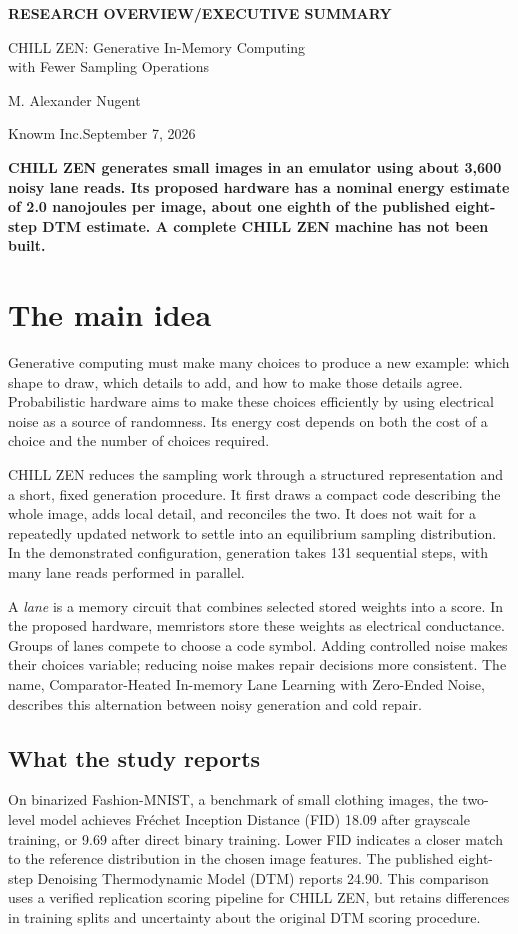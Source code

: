 \documentclass[11pt,letterpaper]{article}
\newcommand{\takeaway}[1]{\par\medskip\noindent\colorbox{pale}{\parbox{\dimexpr\linewidth-2\fboxsep\relax}{\vspace{5pt}\textbf{#1}\vspace{5pt}}}\par\medskip}
\begin{document}
\thispagestyle{plain}
{\small\bfseries\color{ink}RESEARCH OVERVIEW\enspace /\enspace EXECUTIVE SUMMARY\par}
\vspace{9pt}
{\LARGE\bfseries\color{ink}\raggedright CHILL ZEN: Generative In-Memory Computing\\with Fewer Sampling Operations\par}
\vspace{9pt}
{\large M. Alexander Nugent\par}
Knowm Inc.\hfill September 7, 2026
\vspace{5pt}

\takeaway{CHILL ZEN generates small images in an emulator using about 3,600 noisy lane reads. Its proposed hardware has a nominal energy estimate of 2.0 nanojoules per image, about one eighth of the published eight-step DTM estimate. A complete CHILL ZEN machine has not been built.}

\section{The main idea}
Generative computing must make many choices to produce a new example: which shape to draw, which details to add, and how to make those details agree. Probabilistic hardware aims to make these choices efficiently by using electrical noise as a source of randomness. Its energy cost depends on both the cost of a choice and the number of choices required.

CHILL ZEN reduces the sampling work through a structured representation and a short, fixed generation procedure. It first draws a compact code describing the whole image, adds local detail, and reconciles the two. It does not wait for a repeatedly updated network to settle into an equilibrium sampling distribution. In the demonstrated configuration, generation takes 131 sequential steps, with many lane reads performed in parallel.

A \emph{lane} is a memory circuit that combines selected stored weights into a score. In the proposed hardware, memristors store these weights as electrical conductance. Groups of lanes compete to choose a code symbol. Adding controlled noise makes their choices variable; reducing noise makes repair decisions more consistent. The name, Comparator-Heated In-memory Lane Learning with Zero-Ended Noise, describes this alternation between noisy generation and cold repair.

\subsection{What the study reports}
On binarized Fashion-MNIST, a benchmark of small clothing images, the two-level model achieves Fr\'echet Inception Distance (FID) 18.09 after grayscale training, or 9.69 after direct binary training. Lower FID indicates a closer match to the reference distribution in the chosen image features. The published eight-step Denoising Thermodynamic Model (DTM) reports 24.90. This comparison uses a verified replication scoring pipeline for CHILL ZEN, but retains differences in training splits and uncertainty about the original DTM scoring procedure.
\end{document}

